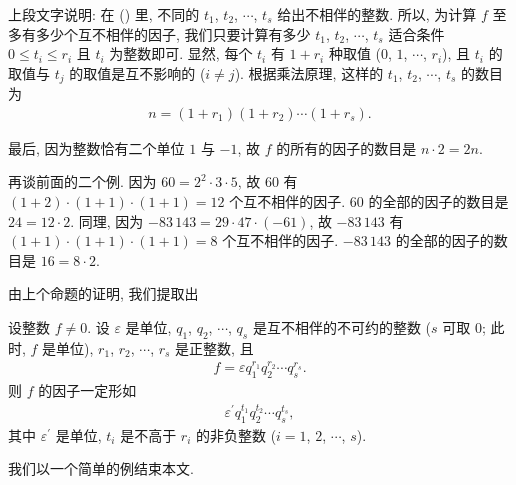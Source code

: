\begin{pf}
    上段文字说明: 在 (\myStar) 里, 不同的 $t_1$, $t_2$, $\cdots$, $t_s$ 给出不相伴的整数. 所以, 为计算 $f$ 至多有多少个互不相伴的因子, 我们只要计算有多少 $t_1$, $t_2$, $\cdots$, $t_s$ 适合条件 $0 \leq t_i \leq r_i$ 且 $t_i$ 为整数即可. 显然, 每个 $t_i$ 有 $1 + r_i$ 种取值 ($0$, $1$, $\cdots$, $r_i$), 且 $t_i$ 的取值与 $t_j$ 的取值是互不影响的 ($i \neq j$). 根据乘法原理, 这样的 $t_1$, $t_2$, $\cdots$, $t_s$ 的数目为
    \begin{align*}
        n = (1 + r_1) (1 + r_2) \cdots (1 + r_s).
    \end{align*}

    最后, 因为整数恰有二个单位 $1$ 与 $-1$, 故 $f$ 的所有的因子的数目是 $n \cdot 2 = 2n$.
\end{pf}

\begin{example}
    再谈前面的二个例. 因为 $60 = 2^2 \cdot 3 \cdot 5$, 故 $60$ 有 $(1+2) \cdot (1+1) \cdot (1+1) = 12$ 个互不相伴的因子. $60$ 的全部的因子的数目是 $24 = 12 \cdot 2$. 同理, 因为 $-83\,143 = 29 \cdot 47 \cdot (-61)$, 故 $-83\,143$ 有 $(1+1) \cdot (1+1) \cdot (1+1) = 8$ 个互不相伴的因子. $-83\,143$ 的全部的因子的数目是 $16 = 8 \cdot 2$.
\end{example}

由上个命题的证明, 我们提取出
\begin{proposition}
    设整数 $f \neq 0$. 设 $\varepsilon$ 是单位, $q_1$, $q_2$, $\cdots$, $q_s$ 是互不相伴的不可约的整数 ($s$ 可取 $0$; 此时, $f$ 是单位), $r_1$, $r_2$, $\cdots$, $r_s$ 是正整数, 且
    \begin{align*}
        f = \varepsilon q_1^{r_1} q_2^{r_2} \cdots q_s^{r_s}.
    \end{align*}
    则 $f$ 的因子一定形如
    \begin{align*}
        \varepsilon^{\prime} q_1^{t_1} q_2^{t_2} \cdots q_s^{t_s},
    \end{align*}
    其中 $\varepsilon^{\prime}$ 是单位, $t_i$ 是不高于 $r_i$ 的非负整数 ($i=1$, $2$, $\cdots$, $s$).
\end{proposition}

我们以一个简单的例结束本文.

